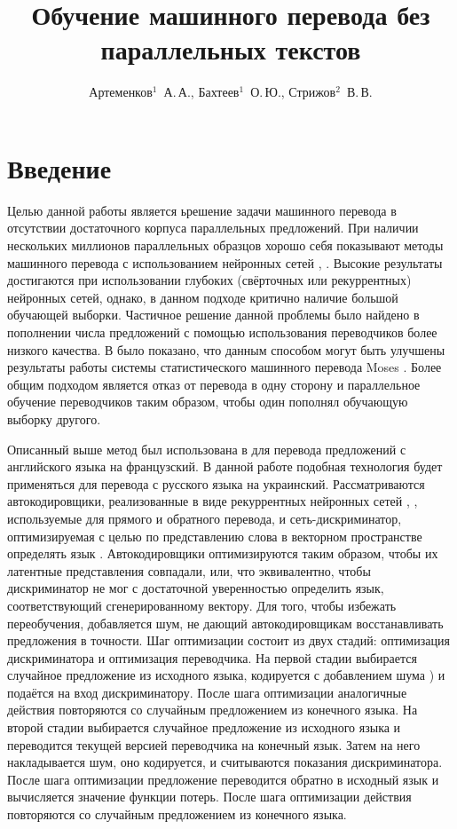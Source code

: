 \documentclass[12pt,twoside]{article}
\title
    [Обучение машинного перевода без параллельных текстов] %
    {Обучение машинного перевода без параллельных текстов}
\author
    [Артеменков$^1$~А.\,А., Бахтеев$^1$~О.\,Ю., Стрижов$^2$~В.\,В.] %
    {Артеменков$^1$~А.\,А., Бахтеев$^1$~О.\,Ю., Стрижов$^2$~В.\,В.} %
    [Артеменков$^1$~А.\,А., Бахтеев$^1$~О.\,Ю., Стрижов$^2$~В.\,В.] %
\begin{document}
\maketitle

\section{Введение}

Целью данной работы является  ьрешение задачи машинного перевода в отсутствии достаточного корпуса параллельных предложений. При наличии нескольких миллионов \cite{bahdanau2014neural} параллельных образцов хорошо себя показывают методы машинного перевода с использованием нейронных сетей \cite{cho2014properties}, \cite{luong2015effective}. Высокие результаты достигаются при использовании глубоких (свёрточных или рекуррентных) нейронных сетей, однако, в данном подходе критично наличие большой обучающей выборки. Частичное решение данной проблемы было найдено в пополнении числа предложений с помощью использования переводчиков более низкого качества. В \cite{bertoldi2009domain} было показано, что данным способом могут быть улучшены результаты работы системы статистического машинного перевода Moses \cite{koehn2007moses}. Более общим подходом является отказ от перевода в одну сторону и параллельное обучение переводчиков таким образом, чтобы один пополнял обучающую выборку другого.

Описанный выше метод был использована в \cite{lample2017unsupervised} для перевода предложений с английского языка на французский. В данной работе подобная технология будет применяться для перевода с русского языка на украинский. Рассматриваются автокодировщики, реализованные в виде рекуррентных нейронных сетей \cite{gers1999learning}, \cite{graves2005framewise}, используемые для прямого и обратного перевода, и сеть-дискриминатор, оптимизируемая с целью по представлению слова в векторном пространстве определять язык \cite{goldberg2014word2vec}. Автокодировщики оптимизируются таким образом, чтобы их латентные представления совпадали, или, что эквивалентно, чтобы дискриминатор не мог с достаточной уверенностью определить язык, соответствующий сгенерированному вектору. Для того, чтобы избежать переобучения, добавляется шум, не дающий автокодировщикам восстанавливать предложения в точности. Шаг оптимизации состоит из двух стадий: оптимизация дискриминатора и оптимизация переводчика. На первой стадии выбирается случайное предложение из исходного языка, кодируется с добавлением шума \cite{kimimproving}) и подаётся на вход дискриминатору. После шага оптимизации аналогичные действия повторяются со случайным предложением из конечного языка. На второй стадии выбирается случайное предложение из исходного языка и переводится текущей версией переводчика на конечный язык. Затем на него накладывается шум, оно кодируется, и считываются показания дискриминатора. После шага оптимизации предложение переводится обратно в исходный язык и вычисляется значение функции потерь. После шага оптимизации действия повторяются со случайным предложением из конечного языка. 
\end{document}

